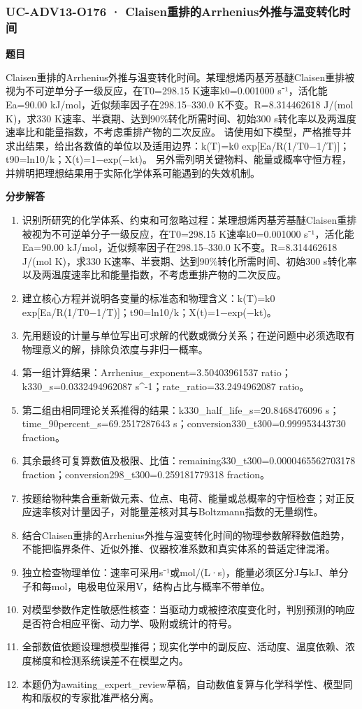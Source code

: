 \documentclass[UTF8,11pt,a4paper]{ctexart}
\begin{document}
\subsubsection*{UC-ADV13-O176 · Claisen重排的Arrhenius外推与温变转化时间}
\noindent\textbf{题目}\par
Claisen重排的Arrhenius外推与温变转化时间。某理想烯丙基芳基醚Claisen重排被视为不可逆单分子一级反应，在T0=298.15 K速率k0=0.001000 s⁻¹，活化能Ea=90.00 kJ/mol，近似频率因子在298.15–330.0 K不变。R=8.314462618 J/(mol K)，求330 K速率、半衰期、达到90\%转化所需时间、初始300 s转化率以及两温度速率比和能量指数，不考虑重排产物的二次反应。 请使用如下模型，严格推导并求出结果，给出各数值的单位以及适用边界：k(T)=k0 exp[Ea/R(1/T0−1/T)]；t90=ln10/k；X(t)=1−exp(−kt)。 另外需列明关键物料、能量或概率守恒方程，并辨明把理想结果用于实际化学体系可能遇到的失效机制。\par
\medskip\noindent\textbf{分步解答}
\begin{enumerate}
\item 识别所研究的化学体系、约束和可忽略过程：某理想烯丙基芳基醚Claisen重排被视为不可逆单分子一级反应，在T0=298.15 K速率k0=0.001000 s⁻¹，活化能Ea=90.00 kJ/mol，近似频率因子在298.15–330.0 K不变。R=8.314462618 J/(mol K)，求330 K速率、半衰期、达到90\%转化所需时间、初始300 s转化率以及两温度速率比和能量指数，不考虑重排产物的二次反应。
\item 建立核心方程并说明各变量的标准态和物理含义：k(T)=k0 exp[Ea/R(1/T0−1/T)]；t90=ln10/k；X(t)=1−exp(−kt)。
\item 先用题设的计量与单位写出可求解的代数或微分关系；在逆问题中必须选取有物理意义的解，排除负浓度与非归一概率。
\item 第一组计算结果：Arrhenius\_exponent=3.50403961537 ratio；k330\_s=0.0332494962087 s\textasciicircum{}-1；rate\_ratio=33.2494962087 ratio。
\item 第二组由相同理论关系推得的结果：k330\_half\_life\_s=20.8468476096 s；time\_90percent\_s=69.2517287643 s；conversion330\_t300=0.999953443730 fraction。
\item 其余最终可复算数值及极限、比值：remaining330\_t300=0.0000465562703178 fraction；conversion298\_t300=0.259181779318 fraction。
\item 按题给物种集合重新做元素、位点、电荷、能量或总概率的守恒检查；对正反应速率核对计量因子，对能量差核对其与Boltzmann指数的无量纲性。
\item 结合Claisen重排的Arrhenius外推与温变转化时间的物理参数解释数值趋势，不能把临界条件、近似外推、仪器校准系数和真实体系的普适定律混淆。
\item 独立检查物理单位：速率可采用s⁻¹或mol/(L·s)，能量必须区分J与kJ、单分子和每mol，电极电位采用V，结构占比与概率不带单位。
\item 对模型参数作定性敏感性核查：当驱动力或被控浓度变化时，判别预测的响应是否符合相应平衡、动力学、吸附或统计的符号。
\item 全部数值依题设理想模型推得；现实化学中的副反应、活动度、温度依赖、浓度梯度和检测系统误差不在模型之内。
\item 本题仍为awaiting\_expert\_review草稿，自动数值复算与化学科学性、模型同构和版权的专家批准严格分离。
\end{enumerate}
\end{document}
